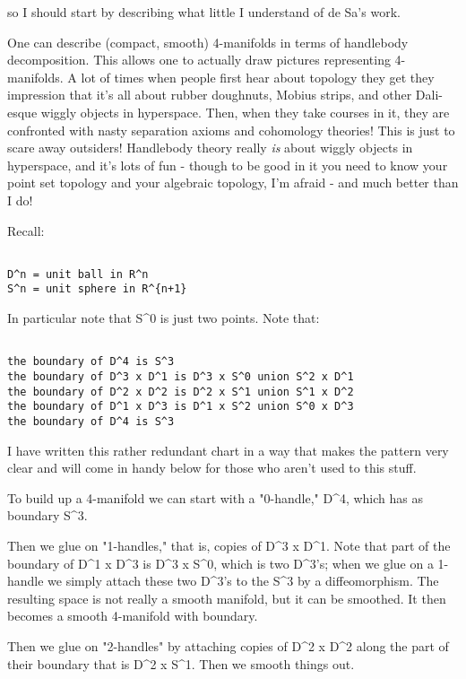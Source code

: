so I should start by describing what little I understand of de Sa's
work.  

One can describe (compact, smooth) 4-manifolds in terms of
handlebody decomposition.  This allows one to actually draw pictures
representing 4-manifolds.  A lot of times when people first hear about
topology they get they impression that it's all about rubber doughnuts,
Mobius strips, and other Dali-esque wiggly objects in hyperspace.  Then,
when they take courses in it, they are confronted with nasty separation
axioms and cohomology theories!  This is just to scare away outsiders!
Handlebody theory really \emph{is} about wiggly objects in hyperspace, and
it's lots of fun  - though to be good in it you need to know your point
set topology and your algebraic topology, I'm afraid - and much better
than I do!  

Recall:


\begin{verbatim}

D^n = unit ball in R^n
S^n = unit sphere in R^{n+1}
\end{verbatim}
    

In particular note that S^0 is just two points.  Note that:


\begin{verbatim}

the boundary of D^4 is S^3
the boundary of D^3 x D^1 is D^3 x S^0 union S^2 x D^1
the boundary of D^2 x D^2 is D^2 x S^1 union S^1 x D^2
the boundary of D^1 x D^3 is D^1 x S^2 union S^0 x D^3
the boundary of D^4 is S^3
\end{verbatim}
    

I have written this rather redundant chart in a way that makes the
pattern very clear and will come in handy below for those who aren't
used to this stuff.

To build up a 4-manifold we can start with a "0-handle," D^4, which has
as boundary S^3.  

Then we glue on "1-handles," that is, copies of D^3 x D^1.  
Note that part of the boundary of D^1 x D^3 is D^3 x S^0, which is two
D^3's; when we glue on a 1-handle we simply attach these two D^3's to
the S^3 by a diffeomorphism.  The resulting space is not really a smooth
manifold, but it can be smoothed.  It then becomes a smooth 4-manifold
with boundary.

Then we glue on "2-handles" by attaching copies of D^2 x D^2 along the
part of their boundary that is D^2 x S^1.  Then we smooth things out.


